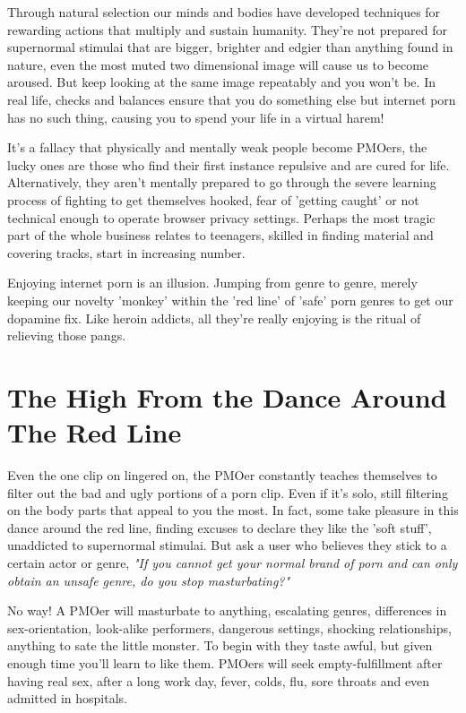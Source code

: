 \documentclass[easypeasy.tex]{subfiles}
\begin{document}
Through natural selection our minds and bodies have developed techniques for rewarding actions that multiply and sustain humanity. They're not prepared for supernormal stimulai that are bigger, brighter and edgier than anything found in nature, even the most muted two dimensional image will cause us to become aroused. But keep looking at the same image repeatably and you won't be. In real life, checks and balances ensure that you do something else but internet porn has no such thing, causing you to spend your life in a virtual harem!

It's a fallacy that physically and mentally weak people become PMOers, the lucky ones are those who find their first instance repulsive and are cured for life. Alternatively, they aren't mentally prepared to go through the severe learning process of fighting to get themselves hooked, fear of 'getting caught' or not technical enough to operate browser privacy settings. Perhaps the most tragic part of the whole business relates to teenagers, skilled in finding material and covering tracks, start in increasing number.

Enjoying internet porn is an illusion. Jumping from genre to genre, merely keeping our novelty 'monkey' within the 'red line' of 'safe' porn genres to get our dopamine fix. Like heroin addicts, all they're  really enjoying is the ritual of relieving those pangs.

\section{The High From the Dance Around The Red Line}
Even the one clip on lingered on, the PMOer constantly teaches themselves to filter out the bad and ugly portions of a porn clip. Even if it's solo, still filtering on the body parts that appeal to you the most. In fact, some take pleasure in this dance around the red line, finding excuses to declare they like the 'soft stuff', unaddicted to supernormal stimulai. But ask a user who believes they stick to a certain actor or genre, \textit{"If you cannot get your normal brand of porn and can only obtain an unsafe genre, do you stop masturbating?"}

No way! A PMOer will masturbate to anything, escalating genres, differences in sex-orientation, look-alike performers, dangerous settings, shocking relationships, anything to sate the little monster. To begin with they taste awful, but given enough time you'll learn to like them. PMOers will seek empty-fulfillment after having real sex, after a long work day, fever, colds, flu, sore throats and even admitted in hospitals.
\end{document}
